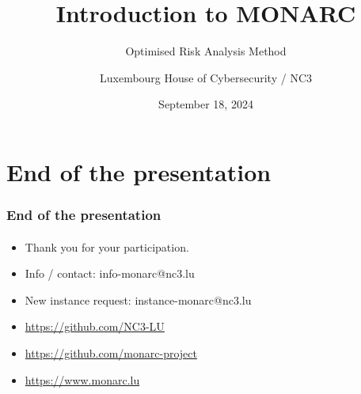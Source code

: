 \documentclass[]{beamer}
\title[Introduction to MONARC]{Introduction to MONARC}
\subtitle{Optimised Risk Analysis Method}
\author[NC3]{Luxembourg House of Cybersecurity / NC3}
\institute[]{\href{https://www.nc3.lu}{National Cybersecurity Competence Centre of Luxembourg}}
\date{September 18, 2024}
\begin{document}
\begin{frame}
  \titlepage
\end{frame}





% 
% 



%
%
\section*{End of the presentation}
\begin{frame}
  \frametitle{End of the presentation}
  \framesubtitle{}
  \begin{center}
    \begin{itemize}
      \item Thank you for your participation.
      \item Info / contact: info-monarc@nc3.lu
      \item New instance request: instance-monarc@nc3.lu
      \item \url{https://github.com/NC3-LU}
      \item \url{https://github.com/monarc-project}
      \item \url{https://www.monarc.lu}
    \end{itemize}
  \end{center}
\end{frame}
\end{document}
